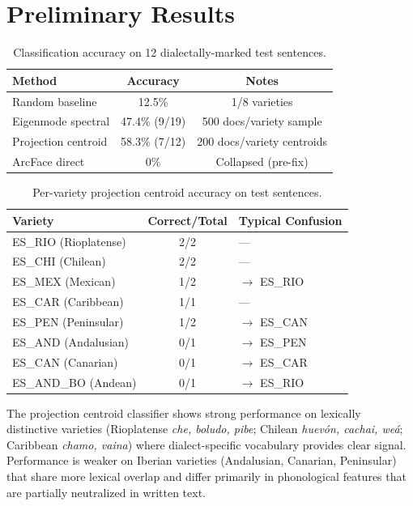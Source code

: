 \documentclass[11pt,a4paper]{article}
\begin{document}
\section{Preliminary Results}

\begin{table}[h]
\centering
\caption{Classification accuracy on 12 dialectally-marked test sentences.}
\label{tab:results}
\begin{tabular}{lcc}
\toprule
\textbf{Method} & \textbf{Accuracy} & \textbf{Notes} \\
\midrule
Random baseline & 12.5\% & 1/8 varieties \\
Eigenmode spectral & 47.4\% (9/19) & 500 docs/variety sample \\
Projection centroid & 58.3\% (7/12) & 200 docs/variety centroids \\
ArcFace direct & 0\% & Collapsed (pre-fix) \\
\bottomrule
\end{tabular}
\end{table}

\begin{table}[h]
\centering
\caption{Per-variety projection centroid accuracy on test sentences.}
\label{tab:per_variety}
\begin{tabular}{lcl}
\toprule
\textbf{Variety} & \textbf{Correct/Total} & \textbf{Typical Confusion} \\
\midrule
ES\_RIO (Rioplatense) & 2/2 & --- \\
ES\_CHI (Chilean) & 2/2 & --- \\
ES\_MEX (Mexican) & 1/2 & $\to$ ES\_RIO \\
ES\_CAR (Caribbean) & 1/1 & --- \\
ES\_PEN (Peninsular) & 1/2 & $\to$ ES\_CAN \\
ES\_AND (Andalusian) & 0/1 & $\to$ ES\_PEN \\
ES\_CAN (Canarian) & 0/1 & $\to$ ES\_CAR \\
ES\_AND\_BO (Andean) & 0/1 & $\to$ ES\_RIO \\
\bottomrule
\end{tabular}
\end{table}

The projection centroid classifier shows strong performance on lexically
distinctive varieties (Rioplatense \emph{che, boludo, pibe}; Chilean
\emph{huev\'on, cachai, weá}; Caribbean \emph{chamo, vaina}) where
dialect-specific vocabulary provides clear signal. Performance is weaker on
Iberian varieties (Andalusian, Canarian, Peninsular) that share more lexical
overlap and differ primarily in phonological features that are partially
neutralized in written text.
\end{document}
